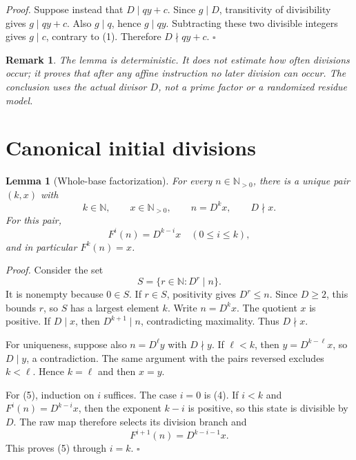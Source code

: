 \documentclass[11pt,letterpaper]{article}
\newcommand{\N}{\mathbb{N}}
\newtheorem{lemma}[theorem]{Lemma}
\newtheorem{remark}[theorem]{Remark}
\newenvironment{proof}{\noindent\textit{Proof.}}{\hfill\(\square\)}
\begin{document}
\begin{proof}
Suppose instead that \(D\mid qy+c\). Since \(g\mid D\), transitivity of
divisibility gives \(g\mid qy+c\). Also \(g\mid q\), hence \(g\mid qy\).
Subtracting these two divisible integers gives \(g\mid c\), contrary to
(1). Therefore \(D\nmid qy+c\).
\end{proof}

\begin{remark}
The lemma is deterministic. It does not estimate how often divisions occur;
it proves that after any affine instruction no later division can occur. The
conclusion uses the actual divisor \(D\), not a prime factor or a randomized
residue model.
\end{remark}

\section{Canonical initial divisions}

\begin{lemma}[Whole-base factorization]
\label{lem:factorization}
For every \(n\in\N_{>0}\), there is a unique pair \((k,x)\) with
\[
k\in\N,
\qquad
x\in\N_{>0},
\qquad
n=D^k x,
\qquad
D\nmid x.                                                     \tag{4}
\]
For this pair,
\[
F^i(n)=D^{k-i}x\quad(0\le i\le k),                           \tag{5}
\]
and in particular \(F^k(n)=x\).
\end{lemma}

\begin{proof}
Consider the set
\[
S=\{r\in\N:D^r\mid n\}.
\]
It is nonempty because \(0\in S\). If \(r\in S\), positivity gives
\(D^r\le n\). Since \(D\ge2\), this bounds \(r\), so \(S\) has a largest
element \(k\). Write \(n=D^k x\). The quotient \(x\) is positive. If
\(D\mid x\), then \(D^{k+1}\mid n\), contradicting maximality. Thus
\(D\nmid x\).

For uniqueness, suppose also \(n=D^\ell y\) with \(D\nmid y\). If
\(\ell<k\), then \(y=D^{k-\ell}x\), so \(D\mid y\), a contradiction. The
same argument with the pairs reversed excludes \(k<\ell\). Hence
\(k=\ell\) and then \(x=y\).

For (5), induction on \(i\) suffices. The case \(i=0\) is (4). If \(i<k\)
and \(F^i(n)=D^{k-i}x\), then the exponent \(k-i\) is positive, so this
state is divisible by \(D\). The raw map therefore selects its division
branch and
\[
F^{i+1}(n)=D^{k-i-1}x.
\]
This proves (5) through \(i=k\).
\end{proof}
\end{document}
